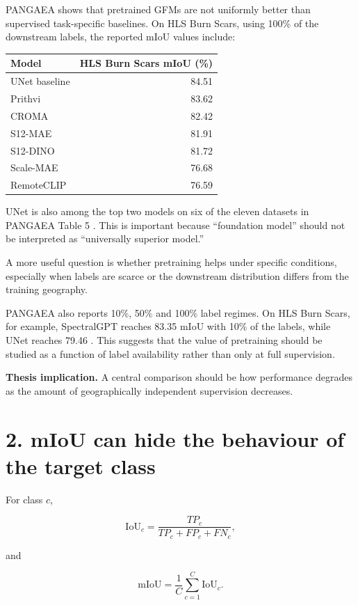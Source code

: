 \documentclass[11pt,a4paper]{article}
\begin{document}
PANGAEA shows that pretrained GFMs are not uniformly better than supervised task-specific baselines.
On HLS Burn Scars, using 100\% of the downstream labels, the reported mIoU values include:

\begin{center}
\begin{tabular}{lr}
\toprule
Model & HLS Burn Scars mIoU (\%) \\
\midrule
UNet baseline & 84.51 \\
Prithvi & 83.62 \\
CROMA & 82.42 \\
S12-MAE & 81.91 \\
S12-DINO & 81.72 \\
Scale-MAE & 76.68 \\
RemoteCLIP & 76.59 \\
\bottomrule
\end{tabular}
\end{center}

UNet is also among the top two models on six of the eleven datasets in PANGAEA Table 5
\cite{pangaea}. This is important because ``foundation model'' should not be interpreted as
``universally superior model.''

A more useful question is whether pretraining helps under specific conditions, especially when labels
are scarce or the downstream distribution differs from the training geography.

PANGAEA also reports 10\%, 50\% and 100\% label regimes. On HLS Burn Scars, for example,
SpectralGPT reaches 83.35 mIoU with 10\% of the labels, while UNet reaches 79.46
\cite{pangaea}. This suggests that the value of pretraining should be studied as a function of
label availability rather than only at full supervision.

\textbf{Thesis implication.}
A central comparison should be how performance degrades as the amount of geographically independent
supervision decreases.

\section{2. mIoU can hide the behaviour of the target class}

For class \(c\),

\[
\mathrm{IoU}_c=\frac{TP_c}{TP_c+FP_c+FN_c},
\]

and

\[
\mathrm{mIoU}=\frac{1}{C}\sum_{c=1}^{C}\mathrm{IoU}_c.
\]
\end{document}
